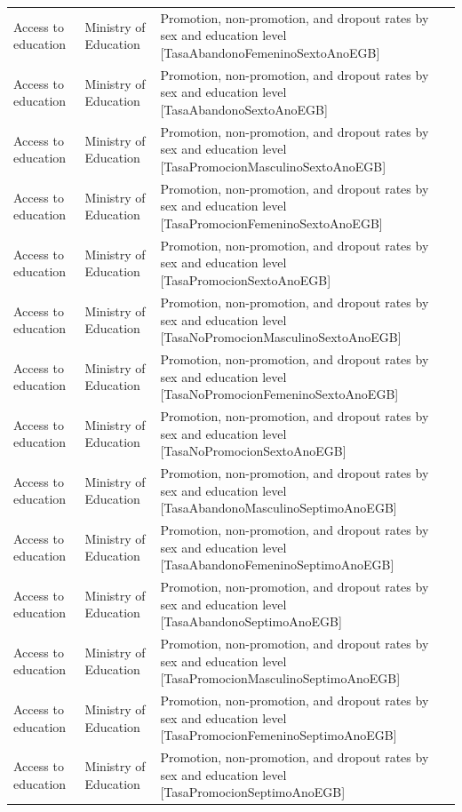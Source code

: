\documentclass[10pt,a4paper]{article}
\begin{document}
\begin{longtable}{@{}>{\raggedright\arraybackslash}p{3.5cm}>{\raggedright\arraybackslash}p{5.6cm}>{\raggedright\arraybackslash}p{\dimexpr\textwidth-9.1cm-4\tabcolsep\relax}@{}}
Access to education & Ministry of Education & Promotion, non-promotion, and dropout rates by sex and education level [TasaAbandonoFemeninoSextoAnoEGB]\\
Access to education & Ministry of Education & Promotion, non-promotion, and dropout rates by sex and education level [TasaAbandonoSextoAnoEGB]\\
Access to education & Ministry of Education & Promotion, non-promotion, and dropout rates by sex and education level [TasaPromocionMasculinoSextoAnoEGB]\\
Access to education & Ministry of Education & Promotion, non-promotion, and dropout rates by sex and education level [TasaPromocionFemeninoSextoAnoEGB]\\
Access to education & Ministry of Education & Promotion, non-promotion, and dropout rates by sex and education level [TasaPromocionSextoAnoEGB]\\
Access to education & Ministry of Education & Promotion, non-promotion, and dropout rates by sex and education level [TasaNoPromocionMasculinoSextoAnoEGB]\\
Access to education & Ministry of Education & Promotion, non-promotion, and dropout rates by sex and education level [TasaNoPromocionFemeninoSextoAnoEGB]\\
Access to education & Ministry of Education & Promotion, non-promotion, and dropout rates by sex and education level [TasaNoPromocionSextoAnoEGB]\\
Access to education & Ministry of Education & Promotion, non-promotion, and dropout rates by sex and education level [TasaAbandonoMasculinoSeptimoAnoEGB]\\
Access to education & Ministry of Education & Promotion, non-promotion, and dropout rates by sex and education level [TasaAbandonoFemeninoSeptimoAnoEGB]\\
Access to education & Ministry of Education & Promotion, non-promotion, and dropout rates by sex and education level [TasaAbandonoSeptimoAnoEGB]\\
Access to education & Ministry of Education & Promotion, non-promotion, and dropout rates by sex and education level [TasaPromocionMasculinoSeptimoAnoEGB]\\
Access to education & Ministry of Education & Promotion, non-promotion, and dropout rates by sex and education level [TasaPromocionFemeninoSeptimoAnoEGB]\\
Access to education & Ministry of Education & Promotion, non-promotion, and dropout rates by sex and education level [TasaPromocionSeptimoAnoEGB]\\

\end{longtable}
\end{document}
